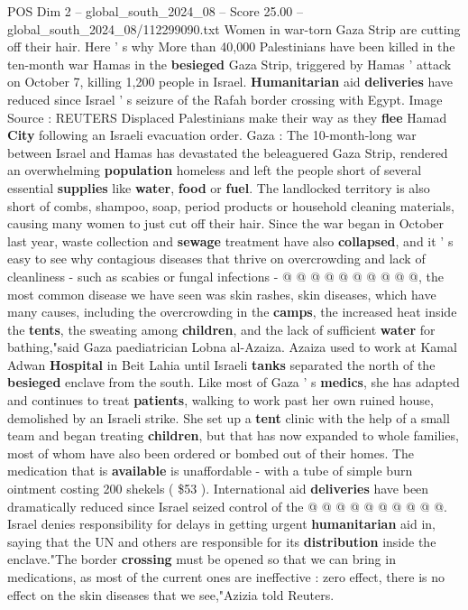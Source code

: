 \begin{textsample}{POS Dim 2 – global\_south\_2024\_08 – Score 25.00 – global\_south\_2024\_08/112299090.txt}  \label{ex:f2_pos_333}
Women in war-torn Gaza Strip are cutting off their hair.
Here ' s why More than 40,000 Palestinians have been killed in the ten-month war Hamas in the \textbf{besieged} Gaza Strip, triggered by Hamas ' attack on October 7, killing 1,200 people in Israel. \textbf{Humanitarian} aid \textbf{deliveries} have reduced since Israel ' s seizure of the Rafah border crossing with Egypt.
Image Source : REUTERS Displaced Palestinians make their way as they \textbf{flee} Hamad \textbf{City} following an Israeli evacuation order.
Gaza : The 10-month-long war between Israel and Hamas has devastated the beleaguered Gaza Strip, rendered an overwhelming \textbf{population} homeless and left the people short of several essential \textbf{supplies} like \textbf{water}, \textbf{food} or \textbf{fuel}.
The landlocked territory is also short of combs, shampoo, soap, period products or household cleaning materials, causing many women to just cut off their hair.
Since the war began in October last year, waste collection and \textbf{sewage} treatment have also \textbf{collapsed}, and it ' s easy to see why contagious diseases that thrive on overcrowding and lack of cleanliness - such as scabies or fungal infections - @ @ @ @ @ @ @ @ @ @, the most common disease we have seen was skin rashes, skin diseases, which have many causes, including the overcrowding in the \textbf{camps}, the increased heat inside the \textbf{tents}, the sweating among \textbf{children}, and the lack of sufficient \textbf{water} for bathing,"said Gaza paediatrician Lobna al-Azaiza.
Azaiza used to work at Kamal Adwan \textbf{Hospital} in Beit Lahia until Israeli \textbf{tanks} separated the north of the \textbf{besieged} enclave from the south.
Like most of Gaza ' s \textbf{medics}, she has adapted and continues to treat \textbf{patients}, walking to work past her own ruined house, demolished by an Israeli strike.
She set up a \textbf{tent} clinic with the help of a small team and began treating \textbf{children}, but that has now expanded to whole families, most of whom have also been ordered or bombed out of their homes.
The medication that is \textbf{available} is unaffordable - with a tube of simple burn ointment costing 200 shekels ( \$53 ).
International aid \textbf{deliveries} have been dramatically reduced since Israel seized control of the @ @ @ @ @ @ @ @ @ @.
Israel denies responsibility for delays in getting urgent \textbf{humanitarian} aid in, saying that the UN and others are responsible for its \textbf{distribution} inside the enclave."The border \textbf{crossing} must be opened so that we can bring in medications, as most of the current ones are ineffective : zero effect, there is no effect on the skin diseases that we see,"Azizia told Reuters.

\end{textsample}
